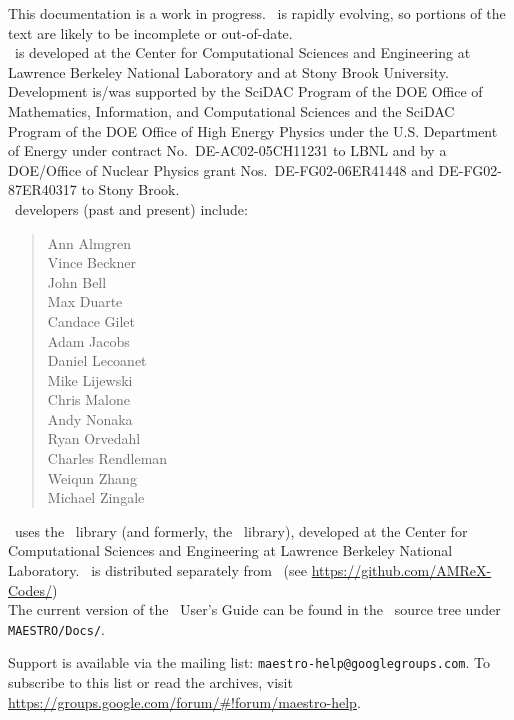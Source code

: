 This documentation is a work in progress.  \maestro\ is rapidly
evolving, so portions of the text are likely to be incomplete or
out-of-date. \\

\noindent \maestro\ is developed at the Center for Computational Sciences and
Engineering at Lawrence Berkeley National Laboratory and at Stony
Brook University.  Development is/was supported by the SciDAC Program of
the DOE Office of Mathematics, Information, and Computational Sciences
and the SciDAC Program of the DOE Office of High Energy Physics under
the U.S. Department of Energy under contract No.\ DE-AC02-05CH11231 to
LBNL and by a DOE/Office of Nuclear Physics grant Nos.\
DE-FG02-06ER41448 and DE-FG02-87ER40317 to Stony Brook.  \\

\noindent \maestro\ developers (past and present) include: 
\begin{quote}
Ann Almgren \\
Vince Beckner \\
John Bell \\
Max Duarte \\
Candace Gilet \\
Adam Jacobs \\
Daniel Lecoanet \\
Mike Lijewski \\
Chris Malone \\
Andy Nonaka \\
Ryan Orvedahl \\
Charles Rendleman \\
Weiqun Zhang \\
Michael Zingale
\end{quote}

\noindent \maestro\ uses the \amrex\ library (and formerly, the
\boxlib\ library), developed at the Center for Computational Sciences
and Engineering at Lawrence Berkeley National Laboratory.  \amrex\ is
distributed separately from \maestro\ (see
\url{https://github.com/AMReX-Codes/}) \\

\noindent The current version of the \maestro\ User's Guide can be found in 
the \maestro\ source tree under {\tt MAESTRO/Docs/}.


\noindent Support is available via the mailing list: {\tt maestro-help@googlegroups.com}.  To subscribe to this list or read the archives, visit
\url{https://groups.google.com/forum/#!forum/maestro-help}.
